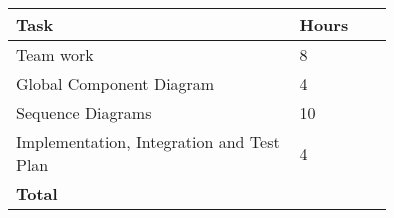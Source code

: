 \smallskip
\begin{center}
\begin{tabular}{ | p{0.75\linewidth} | l | }
  \hline
    \textbf{Task} & \textbf{Hours }\\ \hline
    Team work & 8 \\ \hline
    Global Component Diagram & 4 \\ \hline
    Sequence Diagrams & 10 \\ \hline
    Implementation, Integration and Test Plan & 4 \\ \hline
   \textbf{Total} & \textbf{} \\ \hline
\end{tabular}
\end{center}

\clearpage
